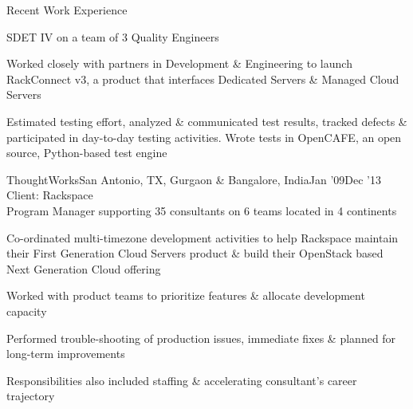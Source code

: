 \documentclass{resume} %
\begin{document}
\begin{rSection}{Recent Work Experience}
\begin{rSubsection}{}{}{}{}
\end{rSubsection}\vspace{-1em}






  \begin{rSubsection}{}{}{}{}
{SDET IV on a team of 3 Quality Engineers}

\item Worked closely with partners in Development \& Engineering to launch RackConnect v3, a product that interfaces Dedicated Servers \& Managed Cloud Servers
\item Estimated testing effort, analyzed \& communicated test results, tracked defects \& participated in day-to-day testing activities. Wrote tests in OpenCAFE, an open source, Python-based test engine

\end{rSubsection}





\begin{rSubsection}{ThoughtWorks}{San Antonio, TX, Gurgaon \& Bangalore, India}{Jan '09}{Dec '13}
    {Client: Rackspace
      \\Program Manager supporting 35 consultants on 6 teams located in 4 continents}

  \item Co-ordinated multi-timezone development activities to help Rackspace maintain their First Generation Cloud Servers product \& build their OpenStack based Next Generation Cloud offering
    \item Worked with product teams to prioritize features \& allocate development capacity
  \item Performed trouble-shooting of production issues, immediate fixes \& planned for long-term improvements
  \item Responsibilities also included staffing \& accelerating consultant's career trajectory
\end{rSubsection}\vspace{-1em}


\end{rSection}
\end{document}
